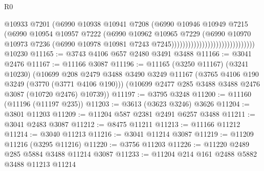 \begin{lexlean}{R0}
\begin{coremodule}
                                                    @10933
                                                    @7201
                                                    (@6990
                                                      @10938
                                                      @10941
                                                      @7208
                                                      (@6990
                                                        @10946
                                                        @10949
                                                        @7215
                                                        (@6990
                                                          @10954
                                                          @10957
                                                          @7222
                                                          (@6990
                                                            @10962
                                                            @10965
                                                            @7229
                                                            (@6990
                                                              @10970
                                                              @10973
                                                              @7236
                                                              (@6990
                                                                @10978
                                                                @10981
                                                                @7243
                                                                @7245))))))))))))))))))))))))))))))
    @10230
@11165 := @3743 @4106 @657 @2480 @3491 @3488
@11166 := @3041 @2476
@11167 := @11166 @3087
@11196 := @11165
    (@3250 @11167)
    (@3241 @10230)
    (@10699
      @208
      @2479
      @3488
      @3490
      @3249
      @11167
      (@3765 @4106 @190 @3249 (@3770 (@3771 @4106 @190)))
      (@10699 @2477 @285 @3488 @3488 @2476 @3087 (@10720 @2476) @10739))
@11197 := @3795 @3248
@11200 := @11160 (@11196 (@11197 @235))
@11203 := @3613 (@3623 @3246) @3626
@11204 := @3801 @11203
@11209 := @11204 @587 @2381 @2491 @6257 @3488
@11211 := @3041 @2483 @3087
@11212 := @8475 @11211
@11213 := @11166 @11212
@11214 := @3040 @11213
@11216 := @3041 @11214 @3087
@11219 := @11209 @11216 (@3295 @11216)
@11220 := @3756 @11203
@11226 := @11220 @2489 @285 @5884 @3488 @11214 @3087
@11233 := @11204 @214 @161 @2488 @5882 @3488 @11213 @11214

\end{coremodule}
\end{lexlean}
